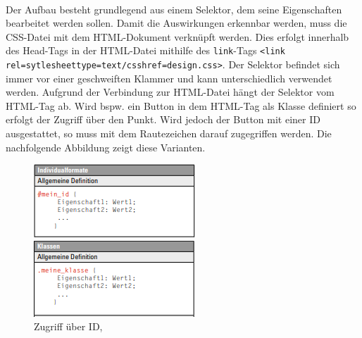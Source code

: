 \documentclass[a4paper,titlepage,halfparskip,12pt]{scrreprt}
\begin{document}
\begin{onehalfspacing}
\\Der Aufbau besteht grundlegend aus einem Selektor, dem seine Eigenschaften bearbeitet werden sollen. Damit die Auswirkungen erkennbar werden, muss die \ac{CSS}-Datei mit dem HTML-Dokument verknüpft werden. Dies erfolgt innerhalb des Head-Tags in der \ac{HTML}-Datei mithilfe des \texttt{link}-Tags \texttt{<link rel=\dq sytlesheet\dq \;type=\dq text/css\dq \;href=\dq design.css\dq>}. Der Selektor befindet sich immer vor einer geschweiften Klammer und kann unterschiedlich verwendet werden. Aufgrund der Verbindung zur HTML-Datei hängt der Selektor vom \ac{HTML}-Tag ab. Wird bspw. ein Button in dem \ac{HTML}-Tag als Klasse definiert so erfolgt der Zugriff über den Punkt. Wird jedoch der Button mit einer ID ausgestattet, so muss mit dem Rautezeichen darauf zugegriffen werden. Die nachfolgende Abbildung zeigt diese Varianten.
\begin{figure}[h]
	\begin{minipage}[c]{.4\textwidth}
		\includegraphics[width=\textwidth]{images/CSSID}
		\caption{Zugriff über ID, \cite{buhler2017html5}} 
		\label{img:CSSID}
	\end{minipage}
	\hspace{.1\linewidth}%
	\begin{minipage}[c]{.4\textwidth}
		\includegraphics[width=\textwidth]{images/CSSKlasse}

\end{minipage}
\end{figure}
\end{onehalfspacing}
\end{document}
